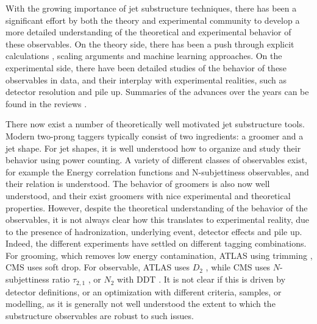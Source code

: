 \documentclass[11pt,letterpaper]{article}
\begin{document}
 With the growing importance of jet substructure techniques, there has been a significant effort by both the theory and experimental community to develop a more detailed understanding of the theoretical and experimental behavior of these observables. On the theory side, there has been a push through explicit calculations \cite{Feige:2012vc,Field:2012rw,Dasgupta:2013ihk,Dasgupta:2013via,Larkoski:2014pca,Dasgupta:2015yua,Seymour:1997kj,Li:2011hy,Larkoski:2012eh,Jankowiak:2012na,Chien:2014nsa,Chien:2014zna,Isaacson:2015fra,Krohn:2012fg,Waalewijn:2012sv,Larkoski:2014tva,Procura:2014cba,Bertolini:2015pka,Bhattacherjee:2015psa,Larkoski:2015kga,Dasgupta:2015lxh,Frye:2016okc,Frye:2016aiz,Kang:2016ehg,Hornig:2016ahz,Marzani:2017mva}, scaling arguments \cite{Walsh:2011fz,Larkoski:2014gra,Larkoski:2014zma} and machine learning \cite{Cogan:2014oua,deOliveira:2015xxd,Almeida:2015jua,Baldi:2016fql,Guest:2016iqz,Conway:2016caq,Barnard:2016qma} approaches. On the experimental side, there have been detailed studies of the behavior of these observables in data, and their interplay with experimental realities, such as detector resolution and pile up. Summaries of the advances over the years can be found in the reviews \cite{Abdesselam:2010pt,Altheimer:2012mn,Altheimer:2013yza,Adams:2015hiv}.

There now exist a number of theoretically well motivated jet substructure tools. Modern two-prong taggers typically consist of two ingredients: a groomer and a jet shape.
For jet shapes, it is well understood how to organize and study their behavior using power counting. A variety of different classes of observables exist, for example the Energy correlation functions and N-subjettiness observables, and their relation is understood. The behavior of groomers is also now well understood, and their exist groomers with nice experimental and theoretical properties. However, despite the theoretical understanding of the behavior of the observables, it is not always clear how this translates to experimental reality, due to the presence of hadronization, underlying event, detector effects and pile up. Indeed, the different experiments have settled on different tagging combinations. For grooming, which removes low energy contamination,  ATLAS using trimming \cite{Krohn:2009th}, CMS uses soft drop\cite{Larkoski:2014wba}. For observable, ATLAS uses $D_2$ \cite{Larkoski:2014gra,Larkoski:2015kga}, while CMS uses $N$-subjettiness ratio $\tau_{2,1}$ \cite{Thaler:2010tr,Thaler:2011gf}, or $N_2$ \cite{Moult:2016cvt} with DDT \cite{Dolen:2016kst}. It is not clear if this is driven by detector definitions, or an optimization with different criteria, samples, or modelling, as it is generally not well understood the extent to which the substructure observables are robust to such issues.
\end{document}
